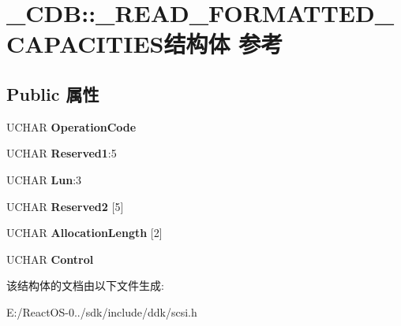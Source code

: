 \hypertarget{struct___c_d_b_1_1___r_e_a_d___f_o_r_m_a_t_t_e_d___c_a_p_a_c_i_t_i_e_s}{}\section{\+\_\+\+C\+DB\+:\+:\+\_\+\+R\+E\+A\+D\+\_\+\+F\+O\+R\+M\+A\+T\+T\+E\+D\+\_\+\+C\+A\+P\+A\+C\+I\+T\+I\+E\+S结构体 参考}
\label{struct___c_d_b_1_1___r_e_a_d___f_o_r_m_a_t_t_e_d___c_a_p_a_c_i_t_i_e_s}
\subsection*{Public 属性}
\begin{DoxyCompactItemize}
\item 
\mbox{\label{struct___c_d_b_1_1___r_e_a_d___f_o_r_m_a_t_t_e_d___c_a_p_a_c_i_t_i_e_s_ab183ee986d8259da75e257af0a626f81}} 
U\+C\+H\+AR {\bfseries Operation\+Code}
\item 
\mbox{\label{struct___c_d_b_1_1___r_e_a_d___f_o_r_m_a_t_t_e_d___c_a_p_a_c_i_t_i_e_s_ae11e631064f1932db91071d40d40a7a5}} 
U\+C\+H\+AR {\bfseries Reserved1}\+:5
\item 
\mbox{\label{struct___c_d_b_1_1___r_e_a_d___f_o_r_m_a_t_t_e_d___c_a_p_a_c_i_t_i_e_s_ae4b5792b6c27fde90685938355e3b4c1}} 
U\+C\+H\+AR {\bfseries Lun}\+:3
\item 
\mbox{\label{struct___c_d_b_1_1___r_e_a_d___f_o_r_m_a_t_t_e_d___c_a_p_a_c_i_t_i_e_s_a7c887718aa3b138b37a6e7f4b7e9974a}} 
U\+C\+H\+AR {\bfseries Reserved2} \mbox{[}5\mbox{]}
\item 
\mbox{\label{struct___c_d_b_1_1___r_e_a_d___f_o_r_m_a_t_t_e_d___c_a_p_a_c_i_t_i_e_s_a89dab2fa4c25d024466324a01f29a8e7}} 
U\+C\+H\+AR {\bfseries Allocation\+Length} \mbox{[}2\mbox{]}
\item 
\mbox{\label{struct___c_d_b_1_1___r_e_a_d___f_o_r_m_a_t_t_e_d___c_a_p_a_c_i_t_i_e_s_a289626046d434f913483fccbe9491baf}} 
U\+C\+H\+AR {\bfseries Control}
\end{DoxyCompactItemize}


该结构体的文档由以下文件生成\+:\begin{DoxyCompactItemize}
\item 
E\+:/\+React\+O\+S-\/0../sdk/include/ddk/scsi.\+h\end{DoxyCompactItemize}
